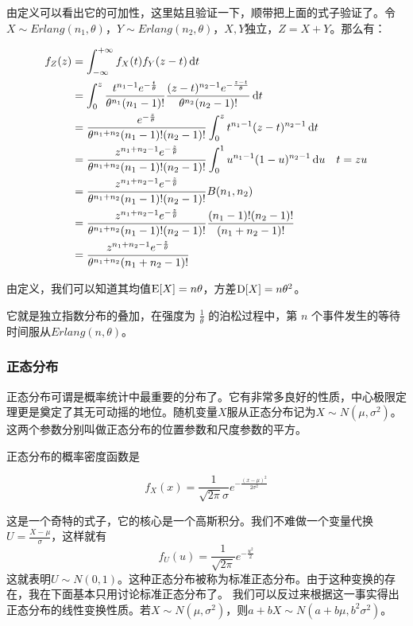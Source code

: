 由定义可以看出它的可加性，这里姑且验证一下，顺带把上面的式子验证了。令$X\sim Erlang(n_1, \theta)$，$Y\sim Erlang(n_2,\theta)$，$X,Y$独立，$Z=X+Y$。那么有：

\begin{align*}
f_Z(z)&=\int_{-\infty}^{+\infty}f_X(t)f_Y(z-t)\mathop{}\!\mathrm{d} t \\
&=\int_{0}^{z}\frac{t^{n_1-1}e^{-\frac{t}{\theta}}}{\theta^{n_1}(n_1-1)!} \frac{(z-t)^{n_2-1}e^{-\frac{z-t}{\theta}}}{\theta^{n_2}(n_2-1)!}\mathop{}\!\mathrm{d} t \\
&= \frac{e^{-\frac{z}{\theta}}}{\theta^{n_1 + n_2}(n_1-1)!(n_2-1)!}\int_{0}^{z}t^{n_1-1}(z-t)^{n_2-1}\mathop{}\!\mathrm{d} t\\
&= \frac{z^{n_1+n_2-1}e^{-\frac{z}{\theta}}}{\theta^{n_1 + n_2}(n_1-1)!(n_2-1)!}\int_{0}^{1}u^{n_1-1}(1-u)^{n_2-1}\mathop{}\!\mathrm{d} u& t=zu\\
&= \frac{z^{n_1+n_2-1}e^{-\frac{z}{\theta}}}{\theta^{n_1 + n_2}(n_1-1)!(n_2-1)!}B(n_1,n_2)\\
&= \frac{z^{n_1+n_2-1}e^{-\frac{z}{\theta}}}{\theta^{n_1 + n_2}(n_1-1)!(n_2-1)!}\frac{(n_1-1)!(n_2-1)!}{(n_1+n_2-1)!}\\
&= \frac{z^{n_1+n_2-1}e^{-\frac{z}{\theta}}}{\theta^{n_1 + n_2}(n_1+n_2-1)!}\\
\end{align*}

由定义，我们可以知道其均值$\operatorname{E}[X]=n\theta$，方差$\operatorname{D}[X]=n\theta^2$。

它就是独立指数分布的叠加，在强度为 $\frac1\theta$ 的泊松过程中，第 $n$ 个事件发生的等待时间服从$Erlang(n,\theta)$。

\subsubsection{正态分布}
正态分布可谓是概率统计中最重要的分布了。它有非常多良好的性质，中心极限定理更是奠定了其无可动摇的地位。随机变量$X$服从正态分布记为$X\sim N(\mu,\sigma^2)$。这两个参数分别叫做正态分布的位置参数和尺度参数的平方。

正态分布的概率密度函数是

\[
f_X(x)=\frac{1}{\sqrt{2\pi}\sigma}e^{-\frac{(x-\mu)^2}{2\sigma^2}}
\]

这是一个奇特的式子，它的核心是一个高斯积分。我们不难做一个变量代换$U=\frac{X-\mu}{\sigma}$，这样就有
\[
f_U(u)=\frac{1}{\sqrt{2\pi}}e^{-\frac{u^2}{2}}
\]
这就表明$U\sim N(0,1)$。这种正态分布被称为标准正态分布。由于这种变换的存在，我在下面基本只用讨论标准正态分布了。
我们可以反过来根据这一事实得出正态分布的线性变换性质。若$X\sim N(\mu,\sigma^2)$，则$a+bX\sim N(a+b\mu, b^2\sigma^2)$。

